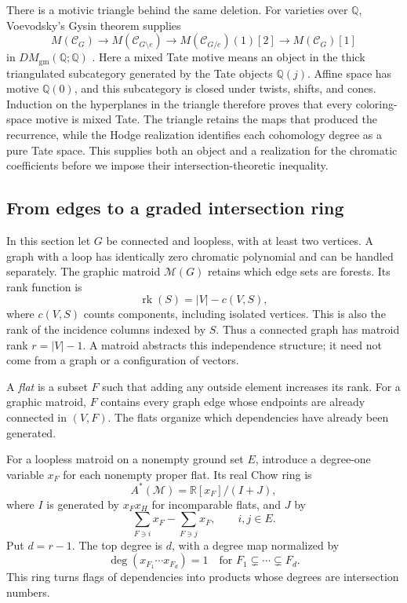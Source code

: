 \documentclass[11pt]{article}
\theoremstyle{definition}
\theoremstyle{remark}
\newcommand{\Q}{\mathbb Q}
\newcommand{\R}{\mathbb R}
\begin{document}
There is a motivic triangle behind the same deletion. For varieties over
$\Q$, Voevodsky's Gysin theorem supplies
\begin{equation}\label{eq:dag-motivic-deletion}
 M(\mathcal C_G)\longrightarrow M(\mathcal C_{G\setminus e})
 \longrightarrow M(\mathcal C_{G/e})(1)[2]
 \longrightarrow M(\mathcal C_G)[1]
\end{equation}
in $DM_{\mathrm{gm}}(\Q;\Q)$
\cite[Proposition 3.5.4]{dagVoevodsky2000}.
Here a mixed Tate motive means an object in the thick triangulated
subcategory generated by the Tate objects $\Q(j)$.
Affine space has motive $\Q(0)$, and this subcategory is closed under
twists, shifts, and cones. Induction on the hyperplanes in the triangle
therefore proves that every coloring-space motive is mixed Tate.
The triangle retains the maps that produced the recurrence, while the
Hodge realization identifies each cohomology degree as a pure Tate space.
This supplies both an object and a realization for the chromatic
coefficients before we impose their intersection-theoretic inequality.

\subsection{From edges to a graded intersection ring}

In this section let $G$ be connected and loopless, with at least two vertices. A graph with a loop has identically zero chromatic polynomial and can be handled separately. The graphic matroid $\mathcal M(G)$ retains which edge sets are forests. Its rank function is
\[
 \operatorname{rk}(S)=|V|-c(V,S),
\]
where $c(V,S)$ counts components, including isolated vertices. This is also the rank of the incidence columns indexed by $S$. Thus a connected graph has matroid rank $r=|V|-1$. A matroid abstracts this independence structure; it need not come from a graph or a configuration of vectors.

A \emph{flat} is a subset $F$ such that adding any outside element increases its rank. For a graphic matroid, $F$ contains every graph edge whose endpoints are already connected in $(V,F)$. The flats organize which dependencies have already been generated.

For a loopless matroid on a nonempty ground set $E$, introduce a degree-one variable $x_F$ for each nonempty proper flat. Its real Chow ring is
\[
 A^*(\mathcal M)=\R[x_F]/(I+J),
\]
where $I$ is generated by $x_Fx_H$ for incomparable flats, and $J$ by
\[
 \sum_{F\ni i}x_F-\sum_{F\ni j}x_F,
 \qquad i,j\in E.
\]
Put $d=r-1$. The top degree is $d$, with a degree map normalized by
\[
 \deg(x_{F_1}\cdots x_{F_d})=1
 \quad\text{for }F_1\subsetneq\cdots\subsetneq F_d.
\]
This ring turns flags of dependencies into products whose degrees are intersection numbers.
\end{document}
